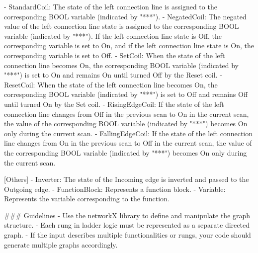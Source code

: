 \begin{shk}
[Coil]
- StandardCoil: The state of the left connection line is assigned to the corresponding BOOL variable (indicated by "***").
- NegatedCoil: The negated value of the left connection line state is assigned to the corresponding BOOL variable (indicated by "***"). If the left connection line state is Off, the corresponding variable is set to On, and if the left connection line state is On, the corresponding variable is set to Off.
- SetCoil: When the state of the left connection line becomes On, the corresponding BOOL variable (indicated by "***") is set to On and remains On until turned Off by the Reset coil.
- ResetCoil: When the state of the left connection line becomes On, the corresponding BOOL variable (indicated by "***") is set to Off and remains Off until turned On by the Set coil.
- RisingEdgeCoil: If the state of the left connection line changes from Off in the previous scan to On in the current scan, the value of the corresponding BOOL variable (indicated by "***") becomes On only during the current scan.
- FallingEdgeCoil: If the state of the left connection line changes from On in the previous scan to Off in the current scan, the value of the corresponding BOOL variable (indicated by "***") becomes On only during the current scan.

[Others]
- Inverter: The state of the Incoming edge is inverted and passed to the Outgoing edge.
- FunctionBlock: Represents a function block.
- Variable: Represents the variable corresponding to the function.

### Guidelines
- Use the networkX library to define and manipulate the graph structure.
- Each rung in ladder logic must be represented as a separate directed graph.
- If the input describes multiple functionalities or rungs, your code should generate multiple graphs accordingly.
\end{shk}
\noindent\begin{minipage}{\textwidth}
\captionsetup{type=figure}
\end{minipage}